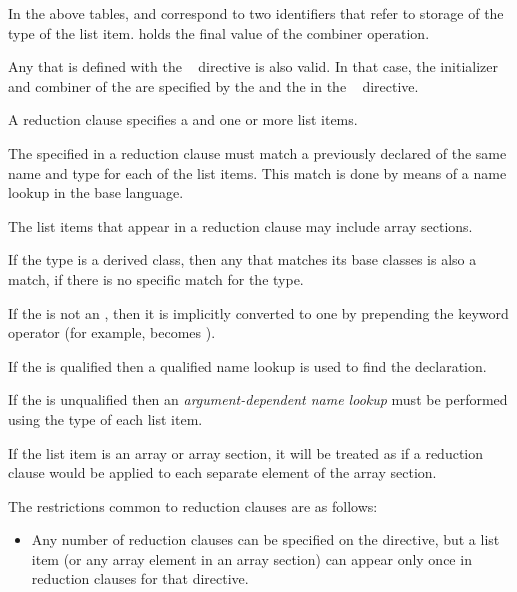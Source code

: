 {{{{\linenumbers

\fortranspecificend
\vspace{\baselineskip}

In the above tables,  and  correspond to two
identifiers that refer to storage of the type of the list item. 
holds the final value of the combiner operation.

Any  that is defined with the ~
directive is also valid. In that case, the initializer and combiner of the
 are specified by the  and
the  in the ~ directive.




\descr
A reduction clause specifies a  and one or more list
items.

The  specified in a reduction clause must match a
previously declared  of the same name and type for
each of the list items. This match is done by means of a name lookup in the
base language.

The list items that appear in a reduction clause may include array sections.


\cppspecificstart
If the type is a derived class, then any  that
matches its base classes is also a match, if there is no specific match for the
type.

If the  is not an , then it is
implicitly converted to one by prepending the keyword operator (for example,
\code{+} becomes ).

If the  is qualified then a qualified name lookup is
used to find the declaration.

If the  is unqualified then an \emph{argument-dependent name lookup}
must be performed using the type of each list item.
\cppspecificend

If the list item is an array or array section, it will be treated as
if a reduction clause would be applied to each separate element
of the array section. 



\restrictions
The restrictions common to reduction clauses are as follows:

\begin{itemize}
\item Any number of reduction clauses can be specified on the directive, but a
list item (or any array element in an array section) can appear only once in
reduction clauses for that directive.


\end{itemize}}}}}

